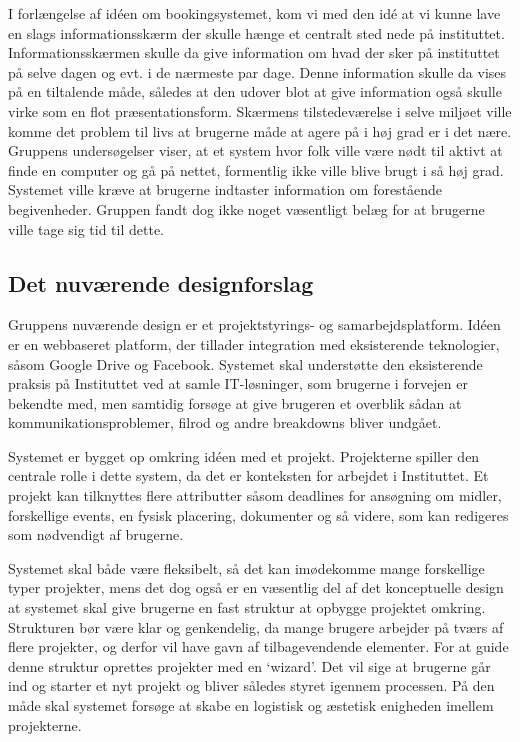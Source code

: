 I forlængelse af idéen om bookingsystemet, kom vi med den idé at vi kunne lave en slags informationsskærm der skulle hænge et centralt sted nede på instituttet. Informationsskærmen skulle da give information om hvad der sker på instituttet på selve dagen og evt. i de nærmeste par dage. Denne information skulle da vises på en tiltalende måde, således at den udover blot at give information også skulle virke som en flot præsentationsform. Skærmens tilstedeværelse i selve miljøet ville komme det problem til livs at brugerne måde at agere på i høj grad er i det nære. Gruppens undersøgelser viser, at et system hvor folk ville være nødt til aktivt at finde en computer og gå på nettet, formentlig ikke ville blive brugt i så høj grad. Systemet ville kræve at brugerne indtaster information om forestående begivenheder. Gruppen fandt dog ikke noget væsentligt belæg for at brugerne ville tage sig tid til dette.

\subsection{Det nuværende designforslag}
Gruppens nuværende design er et projektstyrings- og samarbejdsplatform.
Idéen er en webbaseret platform, der tillader integration med eksisterende teknologier, såsom Google Drive og Facebook. Systemet skal understøtte den eksisterende praksis på Instituttet ved at samle IT-løsninger, som brugerne i forvejen er bekendte med, men samtidig forsøge at give brugeren et overblik sådan at kommunikationsproblemer, filrod og andre breakdowns bliver undgået. 

Systemet er bygget op omkring idéen med et projekt. Projekterne spiller den centrale rolle i dette system, da det er konteksten for arbejdet i Instituttet. Et projekt kan tilknyttes flere attributter såsom deadlines for ansøgning om midler, forskellige events, en fysisk placering, dokumenter og så videre, som kan redigeres som nødvendigt af brugerne. 

Systemet skal både være fleksibelt, så det kan imødekomme mange forskellige typer projekter, mens det dog også er en væsentlig del af det konceptuelle design at systemet skal give brugerne en fast struktur at opbygge projektet omkring. Strukturen bør være klar og genkendelig, da mange brugere arbejder på tværs af flere projekter, og derfor vil have gavn af tilbagevendende elementer.
For at guide denne struktur oprettes projekter med en ‘wizard’. Det vil sige at brugerne går ind og starter et nyt projekt og bliver således styret igennem processen. På den måde skal systemet forsøge at skabe en logistisk og æstetisk enigheden imellem projekterne. 


